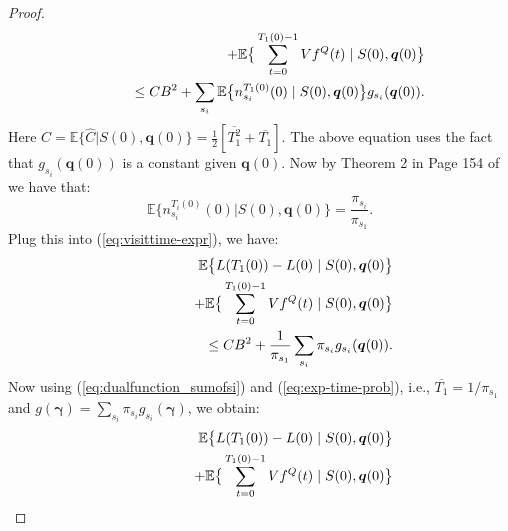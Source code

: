 \documentclass[journal]{IEEEtran}
\newcommand{\expect}[1]{\mathbb{E}\big\{#1\big\}}
\newcommand{\bv}[1]{{\boldsymbol{#1} }}
\begin{document}
\begin{proof}
\begin{eqnarray}
\hspace{-.3in}&& \qquad\qquad\qquad+ \expect{\sum_{t=0}^{T_{1}(0)-1}Vf^Q(t)\left.|\right. S(0), \bv{q}(0)}\nonumber\\
\hspace{-.3in}&& \qquad\qquad \leq CB^2 + \sum_{s_i} \expect{n^{T_1(0)}_{s_i}(0)\left.|\right. S(0), \bv{q}(0)}g_{s_i}(\bv{q}(0)).\nonumber
\end{eqnarray}
Here $C=\expect{\hat{C}\left.|\right. S(0), \bv{q}(0)}=\frac{1}{2}[\overline{T_1^2}+\overline{T_{1}}]$. The above equation uses the fact that $g_{s_i}(\bv{q}(0))$ is a constant given $\bv{q}(0)$. Now by Theorem 2 in Page 154 of \cite{gallager_stochastic} we have that:
\begin{equation}
\expect{n^{T_i(0)}_{s_i}(0)\left.|\right. S(0), \bv{q}(0)}=\frac{\pi_{s_i}}{\pi_{s_1}}. \label{eq:visittime-renewal}
\end{equation}
Plug this into (\ref{eq:visittime-expr}), we have:
\begin{eqnarray}
\hspace{-.3in}&&\expect{L(T_{1}(0))-L(0)\left.|\right. S(0), \bv{q}(0)} \label{eq:visittime-expr-2}\\
\hspace{-.3in}&& \qquad\qquad\qquad+ \expect{\sum_{t=0}^{T_{1}(0)-1}Vf^Q(t)\left.|\right. S(0), \bv{q}(0)}\nonumber\\
\hspace{-.3in}&& \qquad\qquad \leq CB^2 + \frac{1}{\pi_{s_1}}\sum_{s_i}\pi_{s_i}g_{s_i}(\bv{q}(0)).\nonumber
\end{eqnarray}
Now using (\ref{eq:dualfunction_sumofsi}) and (\ref{eq:exp-time-prob}), i.e., $\overline{T_1}=1/\pi_{s_1}$ and $g(\bv{\gamma})=\sum_{s_i}\pi_{s_i}g_{s_i}(\bv{\gamma})$, we obtain:
\begin{eqnarray}
\hspace{-.3in}&&\expect{L(T_{1}(0))-L(0)\left.|\right. S(0), \bv{q}(0)} \label{eq:drift_expected_dual}\\
\hspace{-.3in}&& \qquad\qquad\qquad+ \expect{\sum_{t=0}^{T_{1}(0)-1}Vf^Q(t)\left.|\right. S(0), \bv{q}(0)}\nonumber\\

\end{eqnarray}
\end{proof}
\end{document}
